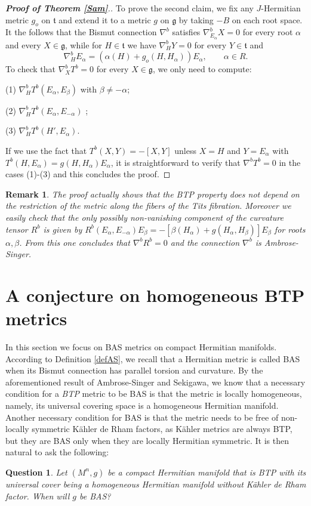 \documentclass{amsart}
\numberwithin{equation}{section}
\newtheorem{question}  [theorem]     {Question}
\newtheorem{remark}  [theorem]     {Remark}
\theoremstyle{definition}
\renewcommand{\1}{\mathds{1}}
\renewcommand{\a}{\alpha}
\renewcommand{\b}{\beta}
\renewcommand{\gg}{\mathfrak g}
\newcommand{\gt}{\mathfrak t}
\renewcommand{\>}{\rightarrow}
\begin{document}
\begin{proof}[{\bf Proof of Theorem \ref{Sam}}.]
To prove the second claim, we fix any $J$-Hermitian metric $g_o$ on $\gt$ and extend it to a metric $g$ on $\gg$ by taking $-B$ on each root space. It the follows that the Bismut connection $\nabla^b$ satisfies $\nabla^b_{E_\a}X=0$ for every root $\a$ and every $X\in \gg$, while for $H\in \gt$ we have $\nabla^b_HY=0$ for every $Y\in \gt$ and
$$\nabla^b_{H}E_\a= (\a(H)+ g_o(H,H_\a))E_\a, \qquad \a\in R.$$
To check that $\nabla^b_XT^b=0$ for every $X\in \gg$, we only need to compute: \par
(1) $\nabla^b_HT^b(E_\a,E_\b)$ with $\b\neq -\a$;\par
(2) $\nabla^b_HT^b(E_\a,E_{-\a})$ ;\par
(3) $\nabla^b_HT^b(H',E_\a)$.\par
If we use the fact that $T^b(X,Y) = -[X,Y]$ unless $X=H$ and $Y=E_\a$ with $T^b(H,E_\a) = g(H,H_\a)E_\a$, it is straightforward to verify that $\nabla^bT^b=0$ in the cases (1)-(3) and this concludes the proof.\end{proof}
\begin{remark}\label{rmkSam} The proof actually shows that the {\rm BTP} property does not depend on the restriction of the metric along the fibers of the Tits fibration. Moreover we easily check that the only possibly non-vanishing component of the curvature tensor $R^b$ is given by $R^b(E_\a,E_{-\a})E_\b=-[\b(H_\a)+g(H_\a,H_\b)]E_\b$ for roots $\a,\b$. From this one concludes that $\nabla^bR^b=0$ and the connection $\nabla^b$ is Ambrose-Singer. \end{remark}
\vspace{.3cm}
\section{A conjecture on homogeneous {\rm BTP} metrics}

In this section we focus on {\rm BAS} metrics on compact Hermitian manifolds. According to Definition \ref{defAS},  we recall that a Hermitian metric is called {\rm BAS} when its Bismut connection has parallel torsion and curvature. By the aforementioned result of Ambrose-Singer and Sekigawa, we know that a necessary condition for a {\em {\rm BTP}} metric to be {\rm BAS} is that the metric is locally homogeneous, namely, its universal covering space is a homogeneous Hermitian manifold. Another necessary condition for {\rm BAS} is that the metric needs to be free of  non-locally symmetric K\"ahler de Rham factors, as K\"ahler metrics are always {\rm BTP}, but they are {\rm BAS} only when they are locally Hermitian symmetric. It is then natural to ask the following:
\begin{question} \label{question5.1}
Let $(M^n,g)$ be a compact Hermitian manifold that is {\rm BTP} with its universal cover being a homogeneous Hermitian manifold without K\"ahler de Rham factor. When will $g$ be {\rm BAS}?
\end{question}
\end{document}
